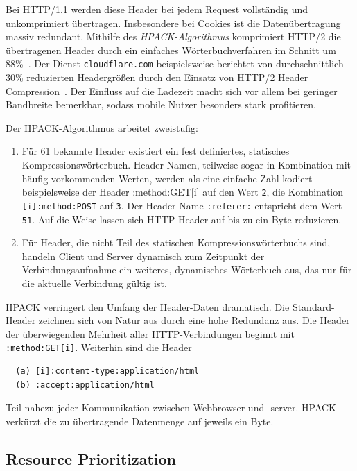 \documentclass[a4paper, justified, notoc]{tufte-handout} %
\begin{document}
Bei HTTP/1.1 werden diese Header bei jedem Request vollständig und unkomprimiert übertragen. Insbesondere bei Cookies ist die Datenübertragung massiv redundant. Mithilfe des \emph{HPACK-Algorithmus} komprimiert HTTP/2 die übertragenen Header durch ein einfaches Wörterbuchverfahren im Schnitt um 88\%~\citep{heise:2018}. Der Dienst \texttt{cloudflare.com} beispielsweise berichtet von durchschnittlich 30\% reduzierten Headergrößen durch den Einsatz von HTTP/2 Header Compression~\citep{vlad:2016}. Der Einfluss auf die Ladezeit macht sich vor allem bei geringer Bandbreite bemerkbar, sodass mobile Nutzer besonders stark profitieren.

Der HPACK-Algorithmus arbeitet zweistufig:
\begin{enumerate}
	\item Für 61 bekannte Header existiert ein fest definiertes, statisches Kompressionswörterbuch. Header-Namen, teilweise sogar in Kombination mit häufig vorkommenden Werten, werden als eine einfache Zahl kodiert -- beispielsweise der Header :method:GET[i] auf den Wert \texttt{2}, die Kombination \texttt{[i]:method:POST} auf \texttt{3}. Der Header-Name \texttt{:referer:} entspricht dem Wert \texttt{51}. Auf die Weise lassen sich HTTP-Header auf bis zu ein Byte reduzieren.
	\item Für Header, die nicht Teil des statischen Kompressionswörterbuchs sind, handeln Client und Server dynamisch zum Zeitpunkt der Verbindungsaufnahme ein weiteres, dynamisches Wörterbuch aus, das nur für die aktuelle Verbindung gültig ist.
\end{enumerate}

HPACK verringert den Umfang der Header-Daten dramatisch. Die Standard-Header zeichnen sich von Natur aus durch eine hohe Redundanz aus. Die Header der überwiegenden Mehrheit aller HTTP-Verbindungen beginnt mit \texttt{:method:GET[i]}. Weiterhin sind die Header 
\begin{Verbatim}
  (a) [i]:content-type:application/html
  (b) :accept:application/html
\end{Verbatim}
Teil nahezu jeder Kommunikation zwischen Webbrowser und -server. HPACK verkürzt die zu übertragende Datenmenge auf jeweils ein Byte.




\subsection{Resource Prioritization} %
\label{sub:resource_prioritization}
\end{document}

